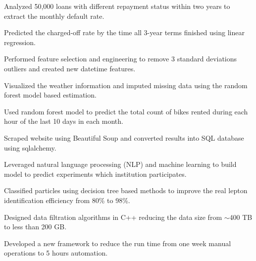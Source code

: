\documentclass[letterpaper]{deedy-resume-openfont}
\begin{document}
\location{}
\begin{tightemize}
\item Analyzed 50,000 loans with different repayment status within two years to extract the monthly default rate.
\item Predicted the charged-off rate by the time all 3-year terms finished using linear regression.
\end{tightemize}
\sectionsep

\location{}
\begin{tightemize}
\item Performed feature selection and engineering to remove 3 standard deviations outliers and created new datetime features.
\item Visualized the weather information and imputed missing data using the random forest model based estimation.
\item Used random forest model to predict the total count of bikes rented during each hour of the last 10 days in each month.
\end{tightemize}
\sectionsep

\location{}
\begin{tightemize}
\item Scraped website using Beautiful Soup and converted results into SQL database using sqlalchemy.
\item Leveraged natural language processing (NLP) and machine learning to build model to predict experiments which institution participates.
\end{tightemize}
\sectionsep

\location{}
\begin{tightemize}
\item Classified particles using decision tree based methods to improve the real lepton identification efficiency from 80\% to 98\%.
\item Designed data filtration algorithms in C++ reducing the data size from $\sim$400 TB to less than 200 GB.%
\item Developed a new framework to reduce the run time from one week manual operations to 5 hours automation.
\end{tightemize}
\sectionsep

\end{document}
